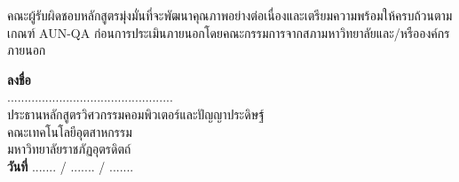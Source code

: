 คณะผู้รับผิดชอบหลักสูตรมุ่งมั่นที่จะพัฒนาคุณภาพอย่างต่อเนื่องและเตรียมความพร้อมให้ครบถ้วนตามเกณฑ์ AUN-QA ก่อนการประเมินภายนอกโดยคณะกรรมการจากสภามหาวิทยาลัยและ/หรือองค์กรภายนอก

\bigskip

\begin{flushleft}
\textbf{ลงชื่อ}\\[4pt]
................................................\\[2pt]
ประธานหลักสูตรวิศวกรรมคอมพิวเตอร์และปัญญาประดิษฐ์\\
คณะเทคโนโลยีอุตสาหกรรม\\
มหาวิทยาลัยราชภัฏอุตรดิตถ์\\[10pt]
\textbf{วันที่} ....... / ....... / .......
\end{flushleft}
